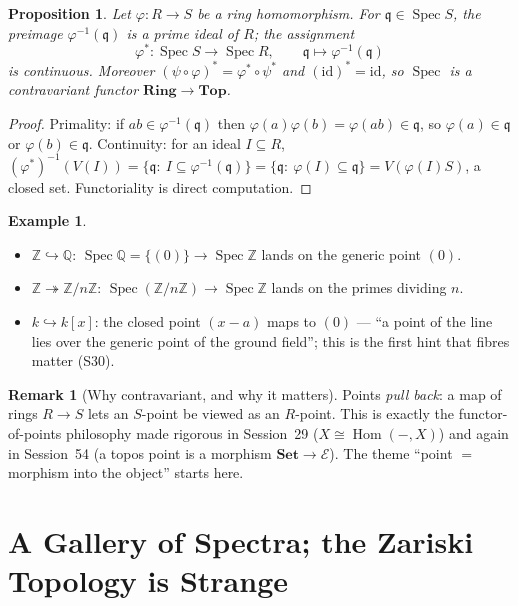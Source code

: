 \documentclass[11pt,a4paper]{article}
\newtheorem{proposition}[theorem]{Proposition}
\theoremstyle{definition}
\newtheorem{example}[theorem]{Example}
\newtheorem{remark}[theorem]{Remark}
\newcommand{\Z}{\mathbb{Z}}
\newcommand{\Q}{\mathbb{Q}}
\newcommand{\Spec}{\operatorname{Spec}}
\newcommand{\Hom}{\operatorname{Hom}}
\newcommand{\q}{\mathfrak{q}}
\begin{document}
	\begin{proposition}\label{prop:functorial}
		Let $\varphi:R\to S$ be a ring homomorphism. For $\q\in\Spec S$, the preimage $\varphi^{-1}(\q)$ is a
		prime ideal of $R$; the assignment
		\[
		\varphi^*:\Spec S\longrightarrow\Spec R,\qquad \q\longmapsto\varphi^{-1}(\q)
		\]
		is continuous. Moreover $(\psi\circ\varphi)^*=\varphi^*\circ\psi^*$ and $(\mathrm{id})^*=\mathrm{id}$,
		so $\Spec$ is a contravariant functor $\mathbf{Ring}\to\mathbf{Top}$.
	\end{proposition}
	\begin{proof}
		Primality: if $ab\in\varphi^{-1}(\q)$ then $\varphi(a)\varphi(b)=\varphi(ab)\in\q$, so
		$\varphi(a)\in\q$ or $\varphi(b)\in\q$. Continuity: for an ideal $I\subseteq R$,
		$(\varphi^*)^{-1}(V(I))=\{\q:\ I\subseteq\varphi^{-1}(\q)\}=\{\q:\ \varphi(I)\subseteq\q\}
		=V(\varphi(I)S)$, a closed set. Functoriality is direct computation.
	\end{proof}
	
	\begin{example}
		\begin{itemize}
			\item $\Z\hookrightarrow\Q$: $\Spec\Q=\{(0)\}\to\Spec\Z$ lands on the generic point $(0)$.
			\item $\Z\twoheadrightarrow\Z/n\Z$: $\Spec(\Z/n\Z)\to\Spec\Z$ lands on the primes dividing $n$.
			\item $k\hookrightarrow k[x]$: the closed point $(x-a)$ maps to $(0)$ --- ``a point of the line
			lies over the generic point of the ground field''; this is the first hint that fibres matter (S30).
		\end{itemize}
	\end{example}
	
	\begin{remark}[Why contravariant, and why it matters]
		Points \emph{pull back}: a map of rings $R\to S$ lets an $S$-point be viewed as an $R$-point. This is
		exactly the functor-of-points philosophy made rigorous in Session~29 ($X\cong\Hom(-,X)$) and again in
		Session~54 (a topos point is a morphism $\mathbf{Set}\to\mathcal E$). The theme ``point $=$ morphism
		into the object'' starts here.
	\end{remark}
	
	\section{A Gallery of Spectra; the Zariski Topology is Strange}
	
\end{document}
